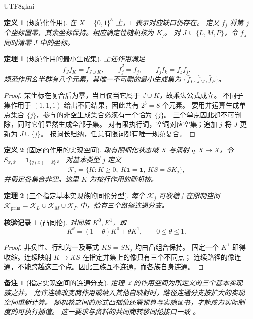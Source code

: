 \documentclass[12pt,a4paper,openany]{report}
\newtheorem{definition}{定义}[chapter]
\newtheorem{theorem}{定理}[chapter]
\newtheorem{remark}{备注}[chapter]
\newtheorem{Certificate}{核验记录}[chapter]
\numberwithin{equation}{chapter}
\begin{document}
\begin{CJK*}{UTF8}{gkai}
\begin{definition}[规范化作用]
在 $\bar X=\{0,1\}^3$ 上，$1$ 表示对应缺口仍存在。
定义 $\bar f_j$ 将第 $j$ 个坐标置零，其余坐标保持。相应确定性随机核为 $\bar K_j$。
对 $J\subseteq\{L,M,P\}$，令 $\bar f_J$ 同时清零 $J$ 中的坐标。
\end{definition}

\begin{theorem}[规范作用的最小生成集]
\label{thm:three-monoid}
上述作用满足
\[
 \bar f_J\bar f_K=\bar f_{J\cup K},\qquad
 \bar f_j^2=\bar f_j,\qquad
 \bar f_j\bar f_k=\bar f_k\bar f_j.
\]
规范作用幺半群有八个元素，其唯一不可删的最小生成集为
$\{\bar f_L,\bar f_M,\bar f_P\}$。
\end{theorem}
\begin{proof}
某坐标在复合后为零，当且仅当它属于 $J\cup K$，故乘法公式成立。
不同子集作用于 $(1,1,1)$ 给出不同结果，因此共有 $2^3=8$ 个元素。
要用并运算生成单点集合 $\{j\}$，参与的非空生成集合必须有一个恰为 $\{j\}$。
三个单点因此都不可删除，同时它们显然生成全部子集。
对有限执行词，空词对应空集；追加 $j$ 将 $J$ 更新为 $J\cup\{j\}$。
按词长归纳，任意有限词都有唯一规范复合。
\end{proof}

\begin{definition}[固定商作用的实现空间]
取有限细化状态域 $X$ 与满射 $q:X\to\bar X$，令
$S_{x,\bar x}=\mathbf1_{\{q(x)=\bar x\}}$。
对基本类型 $j$ 定义
\[
 \mathscr K_j=
 \{K:K\ge0,\ K\mathbf1=\mathbf1,\ KS=S\bar K_j\},
\]
并假定各集合非空。这里 $K$ 为按行作用的随机核。
\end{definition}

\begin{theorem}[三个指定基本实现族的同伦分型]
\label{thm:kernel-components}
每个 $\mathscr K_j$ 可收缩；在限制空间
$\mathscr K_{\mathrm{prim}}=\mathscr K_L\cup\mathscr K_M\cup\mathscr K_P$
中，恰有三个路径连通分支。
\end{theorem}
\begin{Certificate}[凸同伦]
对同族 $K^0,K^1$，取
\[
 K^\theta=(1-\theta)K^0+\theta K^1,\qquad0\le\theta\le1.
\]
\end{Certificate}
\begin{proof}
非负性、行和为一及等式 $KS=S\bar K_j$ 均由凸组合保持。
固定一个 $K^1$ 即得收缩。连续映射 $K\mapsto KS$ 在指定并集上的像只有三个不同点；
连续路径的像连通，不能跨越这三个点。因此三族互不连通，而各族自身连通。
\end{proof}

\begin{remark}[指定实现空间的连通分支]
定理~\ref{thm:kernel-components} 的作用空间为所定义的三个基本实现族之并。
允许连续改变商作用或纳入其他自映射时，路径连通分支按扩大的实现空间重新计算。
随机核之间的形式凸插值还需预算与实施证书，才能成为实际制度的可执行插值。
这一要求与资料的共同商转移同伦接口一致
\cite[《后 AI 转型中的分配传导失灵与可核验治理》，定理“共同商转移下的凸同伦”]{SourceSupplement}。
\end{remark}


\end{CJK*}
\end{document}
